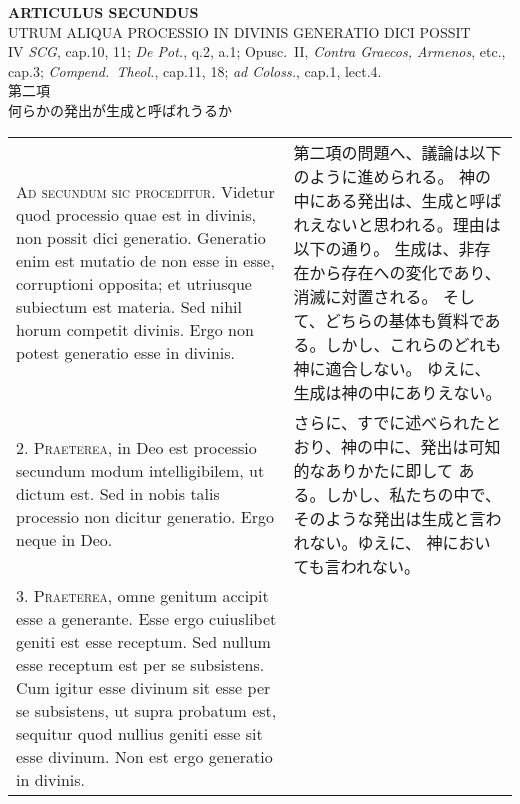 \documentclass[10pt]{jsarticle} %
\begin{document}
\begin{center}
 {\Large {\bf ARTICULUS SECUNDUS}}\\
 {\large UTRUM ALIQUA PROCESSIO IN DIVINIS GENERATIO DICI POSSIT}\\
 {\footnotesize IV {\itshape SCG}, cap.10, 11; {\itshape De Pot.}, q.2,
 a.1; Opusc.~II, {\itshape Contra Graecos, Armenos}, etc., cap.3;
 {\itshape Compend.~Theol.}, cap.11, 18; {\itshape ad Coloss.}, cap.1, lect.4.}\\
 {\Large 第二項\\何らかの発出が生成と呼ばれうるか}
\end{center}

\begin{longtable}{p{21em}p{21em}}



{\scshape Ad secundum sic proceditur}. Videtur quod processio quae est in divinis,
non possit dici generatio. Generatio enim est mutatio de non esse in
esse, corruptioni opposita; et utriusque subiectum est materia. Sed
nihil horum competit divinis. Ergo non potest generatio esse in divinis.


&

第二項の問題へ、議論は以下のように進められる。
神の中にある発出は、生成と呼ばれえないと思われる。理由は以下の通り。
生成は、非存在から存在への変化であり、消滅に対置される。
そして、どちらの基体も質料である。しかし、これらのどれも神に適合しない。
ゆえに、生成は神の中にありえない。


\\



2. {\scshape Praeterea}, in Deo est processio secundum modum intelligibilem, ut dictum
est. Sed in nobis talis processio non dicitur generatio. Ergo neque in
Deo.


&

さらに、すでに述べられたとおり、神の中に、発出は可知的なありかたに即して
 ある。しかし、私たちの中で、そのような発出は生成と言われない。ゆえに、
 神においても言われない。

\\



3. {\scshape Praeterea}, omne genitum accipit esse a generante. Esse ergo cuiuslibet
geniti est esse receptum. Sed nullum esse receptum est per se
subsistens. Cum igitur esse divinum sit esse per se subsistens, ut supra
probatum est, sequitur quod nullius geniti esse sit esse divinum. Non
est ergo generatio in divinis.



\end{longtable}
\end{document}
